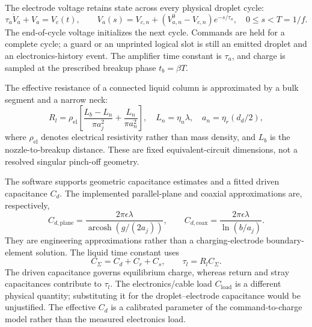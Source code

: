 The electrode voltage retains state across every physical droplet cycle:
\begin{equation}
 \tau_a\dot V_a+V_a=V_c(t),\qquad
 V_a(s)=V_{c,n}+(V_{a,n}^{0}-V_{c,n})e^{-s/\tau_a},
 \quad 0\leq s<T=1/f.
\label{eq:amp}
\end{equation}
The end-of-cycle voltage initializes the next cycle. Commands are held for a complete cycle; a guard or an unprinted logical slot is still an emitted droplet and an electronics-history event. The amplifier time constant is $\tau_a$, and charge is sampled at the prescribed breakup phase $t_b=\beta T$.

The effective resistance of a connected liquid column is approximated by a bulk segment and a narrow neck:
\begin{equation}
 R_l=\rho_{\mathrm{el}}
 \left[\frac{L_b-L_n}{\pi a_j^2}+\frac{L_n}{\pi a_n^2}\right],
 \quad L_n=\eta_n\lambda,\quad a_n=\eta_r(d_d/2),
\end{equation}
where $\rho_{\mathrm{el}}$ denotes electrical resistivity rather than mass density, and $L_b$ is the nozzle-to-breakup distance. These are fixed equivalent-circuit dimensions, not a resolved singular pinch-off geometry.

The software supports geometric capacitance estimates and a fitted driven capacitance $C_d$. The implemented parallel-plane and coaxial approximations are, respectively,
\begin{equation}
 C_{d,\mathrm{plane}}=\frac{2\pi\epsilon\lambda}
 {\operatorname{arcosh}(g/(2a_j))},\qquad
 C_{d,\mathrm{coax}}=\frac{2\pi\epsilon\lambda}{\ln(b/a_j)}.
\end{equation}
They are engineering approximations rather than a charging-electrode boundary-element solution. The liquid time constant uses
\begin{equation}
 C_\Sigma=C_d+C_r+C_s,\qquad \tau_l=R_l C_\Sigma.
\end{equation}
The driven capacitance governs equilibrium charge, whereas return and stray capacitances contribute to $\tau_l$. The electronics/cable load $C_{\mathrm{load}}$ is a different physical quantity; substituting it for the droplet--electrode capacitance would be unjustified. The effective $C_d$ is a calibrated parameter of the command-to-charge model rather than the measured electronics load.


